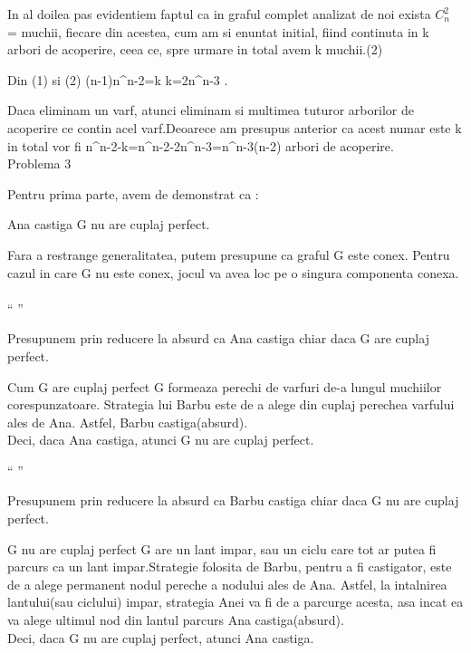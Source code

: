 In al doilea pas evidentiem faptul ca in graful complet analizat de noi exista $C_n^2$ = 
  muchii, fiecare din acestea, cum am si enuntat initial, fiind continuta in k arbori de acoperire, ceea ce, spre urmare \Rightarrow
 in total avem k
  muchii.(2)

Din (1) si (2) \Rightarrow
  (n-1)n^{n-2}=k
 \Rightarrow k=2n^{n-3}
  .

Daca eliminam un varf, atunci eliminam si multimea tuturor arborilor de acoperire ce contin acel varf.Deoarece am presupus anterior ca acest numar este k \Rightarrow
 in total vor fi n^{n-2}-k=n^{n-2}-2n^{n-3}=n^{n-3}(n-2)
  arbori de acoperire.\\

Problema 3

Pentru prima parte, avem de demonstrat ca : 

Ana castiga \Longleftrightarrow
  G nu are cuplaj perfect.

Fara a restrange generalitatea, putem presupune ca graful G este conex. Pentru cazul in care G nu este conex, jocul va avea loc pe o singura componenta conexa. \\\\

“\Rightarrow
 ”

Presupunem prin reducere la absurd ca Ana castiga chiar daca G are cuplaj perfect.

Cum G are cuplaj perfect\Rightarrow
  G formeaza perechi de varfuri de-a lungul muchiilor corespunzatoare. Strategia lui Barbu este de a alege din cuplaj perechea varfului ales de Ana. Astfel, Barbu castiga(absurd).\\Deci, daca Ana castiga, atunci G nu are cuplaj perfect.

“\Leftarrow
 ”

Presupunem prin reducere la absurd ca Barbu castiga chiar daca G nu are cuplaj perfect.

G nu are cuplaj perfect\Rightarrow
 G are un lant impar, sau un ciclu care tot ar putea fi parcurs ca un lant impar.Strategie folosita de Barbu, pentru a fi castigator, este de a alege permanent nodul pereche a nodului ales de Ana. Astfel, la intalnirea lantului(sau ciclului) impar, strategia Anei va fi de a parcurge acesta, asa incat ea va alege ultimul nod din lantul parcurs \Rightarrow
  Ana castiga(absurd).\\

Deci, daca G nu are cuplaj perfect, atunci Ana castiga.\\

